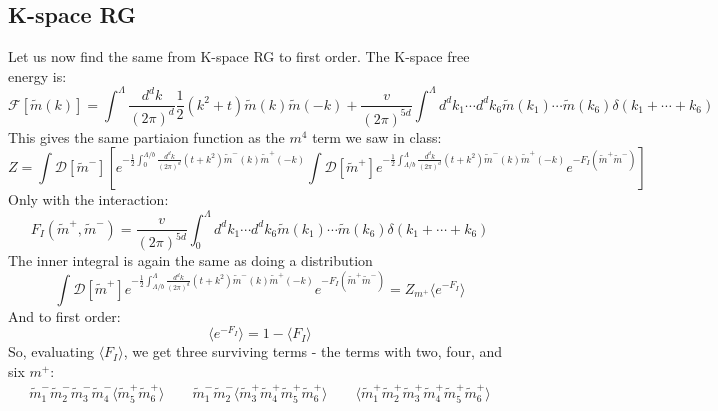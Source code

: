 \documentclass{article}
\begin{document}
\subsection{K-space RG}
Let us now find the same from K-space RG to first order. The K-space free energy is:
\begin{equation}
    \mathcal{F}[\tilde{m}(k)] = \int^\Lambda \frac{d^dk}{(2\pi)^d}\frac{1}{2}(k^2 + t)\tilde{m}(k)\tilde{m}(-k) + \frac{v}{(2\pi)^{5d}}\int^\Lambda d^dk_1 \cdots d^dk_6 \tilde{m}(k_1) \cdots \tilde{m}(k_6) \delta(k_1 + \cdots + k_6)
\end{equation}
This gives the same partiaion function as the $m^4$ term we saw in class:
\begin{equation}
    Z = \int \mathcal{D}[\tilde{m}^{-}] \left[
        e^{-\frac{1}{2}\int_0^{\Lambda/b}\frac{d^dk}{(2\pi)^d}(t+k^2)\tilde{m}^{-}(k)\tilde{m}^{+}(-k)}
        \int \mathcal{D}[\tilde{m}^{+}]
        e^{-\frac{1}{2}\int_{\Lambda/b}^\Lambda\frac{d^dk}{(2\pi)^d}(t+k^2)\tilde{m}^{-}(k)\tilde{m}^{+}(-k)}
        e^{-F_I(\tilde{m}^{+}\tilde{m}^{-})}
    \right]
\end{equation}
Only with the interaction:
\begin{equation}
    F_I(\tilde{m}^{+}, \tilde{m}^{-}) = \frac{v}{(2\pi)^{5d}}\int_0^\Lambda d^dk_1 \cdots d^dk_6 \tilde{m}(k_1) \cdots \tilde{m}(k_6) \delta(k_1 + \cdots + k_6)
\end{equation}
The inner integral is again the same as doing a distribution
\begin{equation}
    \int \mathcal{D}[\tilde{m}^{+}]
        e^{-\frac{1}{2}\int_{\Lambda/b}^\Lambda\frac{d^dk}{(2\pi)^d}(t+k^2)\tilde{m}^{-}(k)\tilde{m}^{+}(-k)}
        e^{-F_I(\tilde{m}^{+}\tilde{m}^{-})}
         = Z_{m^{+}} \langle e^{-F_I} \rangle
\end{equation}
And to first order:
\begin{equation}
    \langle e^{-F_I} \rangle = 1 - \langle F_I \rangle
\end{equation}
So, evaluating $\langle F_I \rangle$, we get three surviving terms - the terms with two, four, and six $m^{+}$:
\begin{equation}
\begin{gathered}
    \tilde{m}_1^{-}\tilde{m}_2^{-}\tilde{m}_3^{-}
    \tilde{m}_4^{-}\langle\tilde{m}_5^{+}\tilde{m}_6^{+}\rangle
    \qquad
    \tilde{m}_1^{-}\tilde{m}_2^{-}\langle\tilde{m}_3^{+}
    \tilde{m}_4^{+}\tilde{m}_5^{+}\tilde{m}_6^{+}\rangle
    \qquad
    \langle\tilde{m}_1^{+}\tilde{m}_2^{+}\tilde{m}_3^{+}
    \tilde{m}_4^{+}\tilde{m}_5^{+}\tilde{m}_6^{+}\rangle
\end{gathered}
\end{equation}
\end{document}
